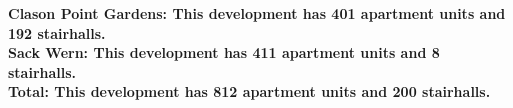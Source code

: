 \bf{Clason Point Gardens}: This development has 401 apartment units and 192 stairhalls.\\\bf{Sack Wern}: This development has 411 apartment units and 8 stairhalls.\\\bf{Total}: This development has 812 apartment units and 200 stairhalls.\\
